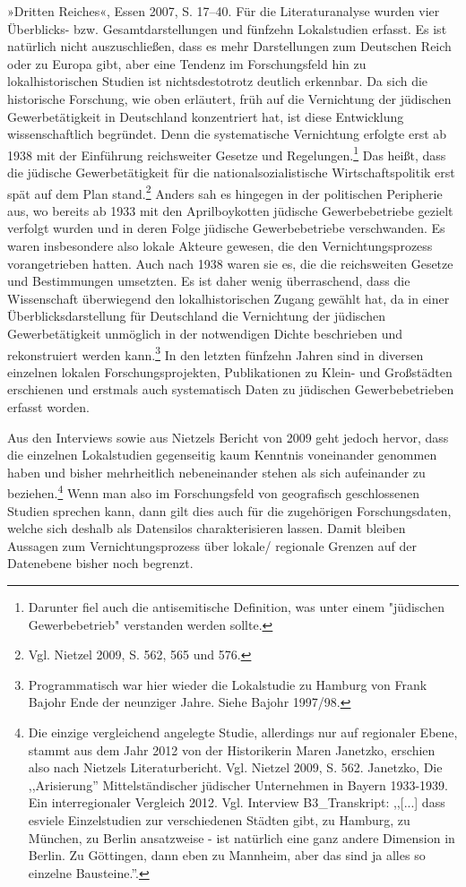 {»Dritten Reiches«, Essen 2007, S. 17–40. Für die Literaturanalyse wurden vier Überblicks- bzw. Gesamtdarstellungen und fünfzehn Lokalstudien erfasst. Es ist natürlich nicht auszuschließen, dass es mehr Darstellungen zum Deutschen Reich oder zu Europa gibt, aber eine Tendenz im Forschungsfeld hin zu lokalhistorischen Studien ist nichtsdestotrotz deutlich erkennbar.} Da sich die historische Forschung, wie oben erläutert, früh auf die Vernichtung der jüdischen Gewerbetätigkeit in Deutschland konzentriert hat, ist diese Entwicklung wissenschaftlich begründet. Denn die systematische Vernichtung erfolgte erst ab 1938 mit der Einführung reichsweiter Gesetze und Regelungen.\footnote{Darunter fiel auch die antisemitische Definition, was unter einem "jüdischen Gewerbebetrieb" verstanden werden sollte.} Das heißt, dass die jüdische Gewerbetätigkeit für die nationalsozialistische Wirtschaftspolitik erst spät auf dem Plan stand.\footnote{Vgl. Nietzel 2009, S. 562, 565 und 576.} Anders sah es hingegen in der politischen Peripherie aus, wo bereits ab 1933 mit den Aprilboykotten jüdische Gewerbebetriebe gezielt verfolgt wurden und in deren Folge jüdische Gewerbebetriebe verschwanden. Es waren insbesondere also lokale Akteure gewesen, die den Vernichtungsprozess vorangetrieben hatten. Auch nach 1938 waren sie es, die die reichsweiten Gesetze und Bestimmungen umsetzten. Es ist daher wenig überraschend, dass die Wissenschaft überwiegend den lokalhistorischen Zugang gewählt hat, da in einer Überblicksdarstellung für Deutschland die Vernichtung der jüdischen Gewerbetätigkeit unmöglich in der notwendigen Dichte beschrieben und rekonstruiert werden kann.\footnote{Programmatisch war hier wieder die Lokalstudie zu Hamburg von Frank Bajohr Ende der neunziger Jahre. Siehe Bajohr 1997/98.} In den letzten fünfzehn Jahren sind in diversen einzelnen lokalen Forschungsprojekten, Publikationen zu Klein- und Großstädten erschienen und erstmals auch systematisch Daten zu jüdischen Gewerbebetrieben erfasst worden. 

Aus den Interviews sowie aus Nietzels Bericht von 2009 geht jedoch hervor, dass die einzelnen Lokalstudien gegenseitig kaum Kenntnis voneinander genommen haben und bisher mehrheitlich nebeneinander stehen als sich aufeinander zu beziehen.\footnote{Die einzige vergleichend angelegte Studie, allerdings nur auf regionaler Ebene, stammt aus dem Jahr 2012 von der Historikerin Maren Janetzko, erschien also nach Nietzels Literaturbericht. Vgl. Nietzel 2009, S. 562. Janetzko, Die ,,Arisierung'' Mittelständischer jüdischer Unternehmen in Bayern 1933-1939. Ein interregionaler Vergleich 2012. Vgl. Interview B3\_Transkript: ,,[...] dass esviele Einzelstudien zur verschiedenen Städten gibt, zu Hamburg, zu München, zu Berlin ansatzweise - ist natürlich eine ganz andere Dimension in Berlin. Zu Göttingen, dann eben zu Mannheim, aber das sind ja alles so einzelne Bausteine.''.} Wenn man also im Forschungsfeld von geografisch geschlossenen Studien sprechen kann, dann gilt dies auch für die zugehörigen Forschungsdaten, welche sich deshalb als Datensilos charakterisieren lassen. Damit bleiben Aussagen zum Vernichtungsprozess über lokale/ regionale Grenzen auf der Datenebene bisher noch begrenzt. 

